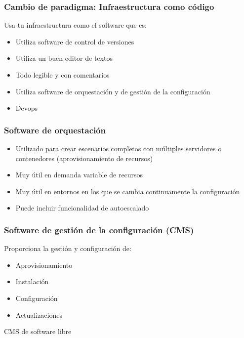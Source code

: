 \documentclass[aspectratio=169]{beamer}
\begin{document}
\begin{frame}
  \frametitle{Cambio de paradigma: Infraestructura como código}
  Usa tu infraestructura como el software que es:
  \begin{itemize}
  \item Utiliza software de control de versiones
  \item Utiliza un buen editor de textos
  \item Todo legible y con comentarios
  \item Utiliza software de orquestación y de gestión de la configuración
  \item Devops
  \end{itemize}
\end{frame}

\begin{frame}
  \frametitle{Software de orquestación}
  \begin{itemize}
  \item Utilizado para crear escenarios completos con múltiples servidores o contenedores (aprovisionamiento de recursos)
  \item Muy útil en demanda variable de recursos
  \item Muy útil en entornos en los que se cambia continuamente la configuración
  \item Puede incluir funcionalidad de autoescalado
  \end{itemize}
\end{frame}

\begin{frame}
  \frametitle{Software de gestión de la configuración (CMS)}
  Proporciona la gestión y configuración de:
  \begin{itemize}
  \item Aprovisionamiento
  \item Instalación
  \item Configuración
  \item Actualizaciones
  \end{itemize}
\end{frame}

\begin{frame}
  \begin{Large}
    \begin{center}
      CMS de software libre
    \end{center}
  \end{Large}
\end{frame}
\end{document}
